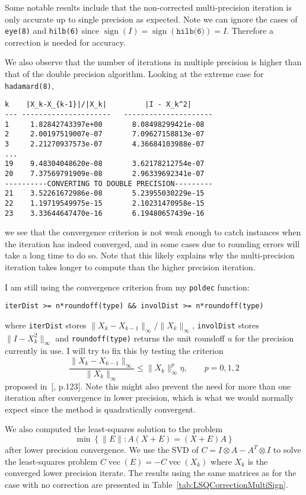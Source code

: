 \documentclass[10pt, A4paper]{article}
\DeclareMathOperator{\sign}{sign}
\DeclareMathOperator{\matVec}{vec}
\begin{document}
Some notable results include that the non-corrected multi-precision 
iteration is only accurate up to single precision as expected. Note we 
can ignore the cases of \texttt{eye(8)} and \texttt{hilb(6)} since 
$\sign(I) = \sign(\texttt{hilb(6)}) = I$.
Therefore a correction is needed for accuracy.

We also observe that the number of iterations in multiple precision is 
higher than that of the double precision algorithm.
Looking at the extreme case for \texttt{hadamard(8)},
\begin{Verbatim}
k    |X_k-X_{k-1}|/|X_k|         |I - X_k^2|     
--- ---------------------   ---------------------
1     1.82842743397e+00       8.08498299421e-08  
2     2.00197519007e-07       7.09627158813e-07  
3     2.21270937573e-07       4.36684103988e-07  
...
19    9.48304048620e-08       3.62178212754e-07  
20    7.37569791909e-08       2.96339692341e-07  
----------CONVERTING TO DOUBLE PRECISION---------
21    3.52261672986e-08       5.23955030229e-15  
22    1.19719549975e-15       2.10231470958e-15  
23    3.33644647470e-16       6.19480657439e-16  
\end{Verbatim}
we see that the convergence criterion is not weak enough to catch 
instances when the iteration has indeed converged, and in some cases 
due to rounding errors will take a long time to do so.
Note that this likely explains why the multi-precision iteration takes 
longer to compute than the higher precision iteration.

I am still using the convergence criterion from my \texttt{poldec} 
function:
\begin{Verbatim}
iterDist >= n*roundoff(type) && involDist >= n*roundoff(type)
\end{Verbatim}
where \texttt{iterDist} stores $\|X_k - X_{k-1}\|_\infty / 
\|X_k\|_\infty$,
\texttt{involDist} stores $\|I - X_k^2\|_\infty$
and \texttt{roundoff(type)} returns the unit roundoff $u$ for 
the precision currently in use.
I will try to fix this by testing the criterion
$$\dfrac{\|X_k - X_{k-1}\|_\infty}{\|X_k\|_\infty} \leq 
\|X_k\|_\infty^p 
\eta,\qquad p = 0,1,2$$
proposed in~[\citealp{high2008}, p.123].
Note this might also prevent the need for more than one iteration after 
convergence in lower precision, which is what we would normally 
expect since the method is quadratically convergent.

We also computed the least-squares solution to the problem
$$ \min\left\{ \|E\|: A(X+E) = (X+E)A\right\}$$
after lower precision convergence.
We use the SVD of $C = I\otimes A - A^T \otimes I$ to solve the 
least-squares problem $C \matVec(E) = -C\matVec(X_k)$ where $X_k$ is 
the converged lower precision iterate.
The results using the same matrices as for the case with no correction 
are presented in Table~\ref{tab:LSQCorrectionMultiSign}.
\end{document}
